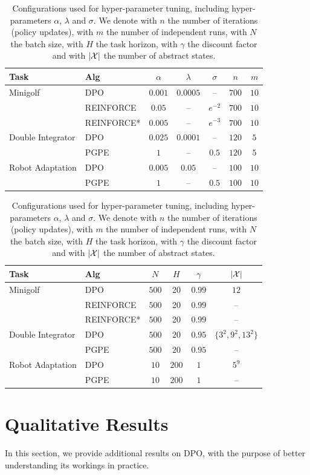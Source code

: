 \begin{table}[H]
	\begin{tabular}{ll|ccccc}
		\toprule
		\textbf{Task} & \textbf{Alg} & $\alpha$ & $\lambda$ & $\sigma$ & $n$ & $m$\\
		\midrule
		Minigolf & DPO & $0.001$ & $0.0005$ & -- & $700$ & $10$ \\
		& REINFORCE & $0.05$ & -- & $e^{-2}$ & $700$ & $10$ \\
		& REINFORCE* & $0.005$ & -- & $e^{-3}$ & $700$ & $10$ \\
		\midrule
		Double Integrator & DPO & $0.025$ & $0.0001$ & -- & $120$ & $5$ \\
		& PGPE & $1$ & -- & $0.5$ & $120$ & $5$ \\
		\midrule
		Robot Adaptation & DPO & $0.005$ & $0.05$ & -- & $100$ & $10$ \\
		& PGPE & $1$ & -- & $0.5$ & $100$ & $10$ \\
		\midrule
	\end{tabular}
	\begin{tabular}{ll|cccc}
		\toprule
		\textbf{Task} & \textbf{Alg} & $N$ & $H$ & \textbf{$\gamma$} & $|\mathcal{X}|$\\
		\midrule
		Minigolf & DPO & $500$ & 20 & $0.99$ & $12$ \\
		& REINFORCE & $500$ & 20 & $0.99$ & -- \\
		& REINFORCE* & $500$ & 20 & $0.99$ & -- \\
		\midrule
		Double Integrator & DPO & $500$ & $20$ & $0.95$ & $\{3^{2},9^{2},13^{2}\}$ \\
		& PGPE & $500$ & $20$ & $0.95$ & -- \\
		\midrule
		Robot Adaptation & DPO & $10$ & $200$ & $1$ & $5^{9}$ \\
		& PGPE & $10$ & $200$ & $1$ & --\\
		\midrule
	\end{tabular}
	\caption{\label{tab:recap2}Configurations used for hyper-parameter tuning, including hyper-parameters $\alpha$, $\lambda$ and $\sigma$. We denote with $n$ the number of iterations (policy updates), with $m$ the number of independent runs, with $N$ the batch size, with $H$ the task horizon, with $\gamma$ the discount factor and with $|\mathcal{X}|$ the number of abstract states.}
\end{table}


\section{Qualitative Results}\label{sec:exp3}
In this section, we provide additional results on \ac{DPO}, with the purpose of better understanding its workings in practice. 

